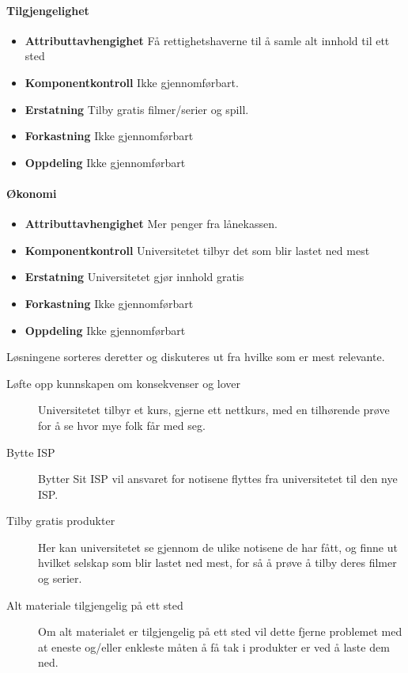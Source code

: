 \paragraph{Tilgjengelighet}
\begin{itemize}
    \item \textbf{Attributtavhengighet} Få rettighetshaverne til å samle alt innhold til ett sted 
    \item \textbf{Komponentkontroll} Ikke gjennomførbart.
    \item \textbf{Erstatning} Tilby gratis filmer/serier og spill.
    \item \textbf{Forkastning} Ikke gjennomførbart
    \item \textbf{Oppdeling} Ikke gjennomførbart
\end{itemize}

\paragraph{Økonomi}
\begin{itemize}
    \item \textbf{Attributtavhengighet} Mer penger fra lånekassen. 
    \item \textbf{Komponentkontroll} Universitetet tilbyr det som blir lastet ned mest
    \item \textbf{Erstatning} Universitetet gjør innhold gratis
    \item \textbf{Forkastning} Ikke gjennomførbart
    \item \textbf{Oppdeling} Ikke gjennomførbart
\end{itemize}

Løsningene sorteres deretter og diskuteres ut fra hvilke som er mest relevante. 

\begin{description}
    \item [Løfte opp kunnskapen om konsekvenser og lover] Universitetet tilbyr et kurs, gjerne ett nettkurs, med en tilhørende prøve for å se hvor mye folk får med seg.
    \item [Bytte ISP] Bytter Sit ISP vil ansvaret for notisene flyttes fra universitetet til den nye ISP. 
    \item [Tilby gratis produkter] Her kan universitetet se gjennom de ulike notisene de har fått, og finne ut hvilket selskap som blir lastet ned mest, for så å prøve å tilby deres filmer og serier.
    \item [Alt materiale tilgjengelig på ett sted] Om alt materialet er tilgjengelig på ett sted vil dette fjerne problemet med at eneste og/eller enkleste måten å få tak i produkter er ved å laste dem ned.
\end{description}

